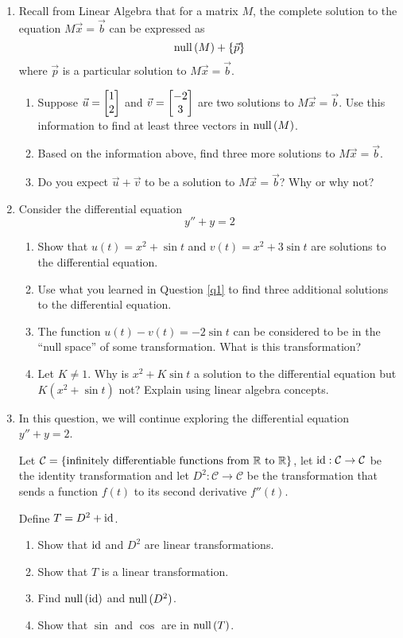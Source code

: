 \begin{enumerate}
	\item\label{q1}
	Recall from Linear Algebra that for a matrix $M$, the complete solution to the equation $M\vec x=\vec b$ can be expressed as
	\[
		\mathrm{null}\,(M)+\{\vec p\}
	\]
		where $\vec p$ is a particular solution to $M\vec x=\vec b$.
		
	\begin{enumerate}
		\item Suppose $\vec u=\begin{bmatrix}1\\2\end{bmatrix}$ and $\vec v=\begin{bmatrix}-2\\3\end{bmatrix}$ are two solutions to $M\vec x=\vec b$. Use this information
		to find at least three vectors in $\mathrm{null}\,(M)$.
		\item Based on the information above, find three more solutions to $M\vec x=\vec b$.
		\item Do you expect $\vec u+\vec v$ to be a solution to $M\vec x=\vec b$? Why or why not?
	\end{enumerate}

	\item Consider the differential equation
	\[
		y''+y=2
	\]
	\begin{enumerate}
		\item Show that $u(t)=x^2+\sin t$ and $v(t)=x^2+3\sin t$ are solutions to the differential equation.
		\item Use what you learned in Question \ref{q1} to find three additional solutions to the differential equation.
		\item The function $u(t)-v(t)=-2\sin t$ can be considered to be in the ``null space'' of some transformation. What is this transformation?
		\item Let $K\neq 1$. Why is $x^2+K\sin t$ a solution to the differential equation but $K(x^2+\sin t)$ not? Explain using linear algebra concepts.
	\end{enumerate}

	\item In this question, we will continue exploring the differential equation $y''+y=2$.
	
	Let $\mathcal C=\{\text{infinitely differentiable functions from $\mathbb{R}$ to $\mathbb{R}$}\}$, let $\operatorname{id}:\mathcal C\to\mathcal C$
	be the identity transformation and let $D^2:\mathcal C\to\mathcal C$ be the transformation that sends a function $f(t)$ to its second derivative $f''(t)$.

	Define $T=D^2+\operatorname{id}$.

	\begin{enumerate}
		\item Show that $\operatorname{id}$ and $D^2$ are linear transformations.
		\item Show that $T$ is a linear transformation.
		\item Find $\mathrm{null}\,(\operatorname{id})$ and $\mathrm{null}\,(D^2)$.
		\item Show that $\sin$ and $\cos$ are in $\mathrm{null}\,(T)$.
	\end{enumerate}



\end{enumerate}

